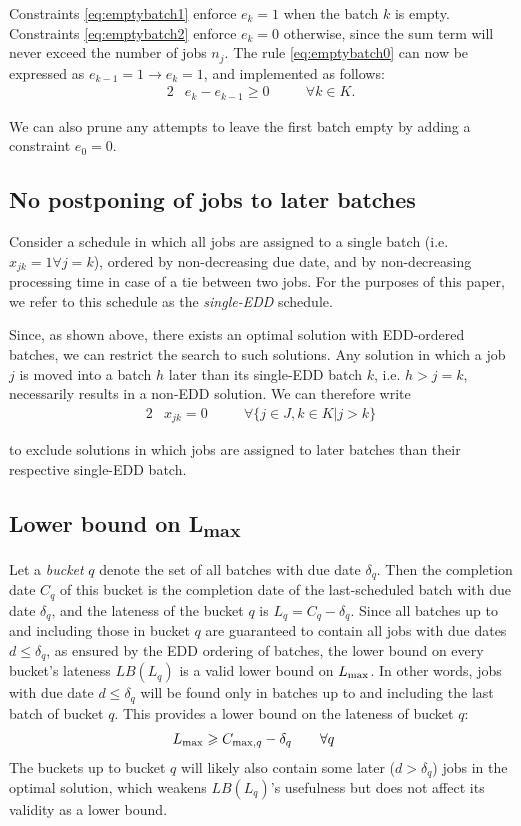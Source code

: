 \documentclass[13pt, letterpaper, oneside]{book}
\begin{document}
Constraints \eqref{eq:emptybatch1} enforce $e_k = 1$ when the batch $k$ is
empty. Constraints \eqref{eq:emptybatch2} enforce $e_k = 0$ otherwise, since the
sum term will never exceed the number of jobs $n_j$. The rule \eqref{eq:emptybatch0} can now be
expressed as $e_{k-1} = 1 \rightarrow e_k = 1$, and implemented as follows:
\begin{alignat}{2}
& e_k - e_{k-1} \geq 0 \quad && \forall k \in K.
\end{alignat}

We can also prune any attempts to leave the first batch empty by adding a constraint $e_0 = 0$.

\subsection{No postponing of jobs to later batches}
\label{sec:nopostponing}
Consider a schedule in which all jobs are assigned to a single batch (i.e.
$x_{jk} = 1 \forall j = k$), ordered by non-decreasing due date, and by
non-decreasing processing time in case of a tie between two jobs. For the
purposes of this paper, we refer to this schedule as the \textit{single-EDD}
schedule. 

Since, as shown above, there exists an optimal solution with EDD-ordered
batches, we can restrict the search to such solutions. Any solution in which
a job $j$ is moved into a batch $h$ later than its single-EDD batch $k$, i.e. $h
> j = k$, necessarily results in a non-EDD solution. We can therefore write
\begin{alignat}{2}
  & x_{jk} = 0 \quad && \forall \{j \in J, k \in K | j > k \} \label{eq:mipnopp}
\end{alignat}

to exclude solutions in which jobs are assigned to later batches than their
respective single-EDD batch.

\subsection[Lower bound on $\Lmax$]{Lower bound on {\sansitalicfont L}\textsubscript{max}}
Let a \textit{bucket} $q$ denote the set of all batches with due date $\delta_q$.
Then the completion date $C_q$ of this bucket is the completion date of the
last-scheduled batch with due date $\delta_q$, and the lateness of the bucket
$q$ is $L_q = C_q - \delta_q$. Since all batches up to and including those in
bucket $q$ are guaranteed to contain all jobs with due dates $d \leq \delta_q$,
as ensured by the EDD ordering of batches, the lower bound on every bucket's
lateness $LB(L_q)$ is a valid lower bound on $\Lmax$. In other words,
jobs with due date $d \leq \delta_q$ will be found only in batches up to and
including the last
batch of bucket $q$. This provides a lower bound on the lateness of bucket $q$:
\begin{alignat}{2}
& L_{\text{max}} \geqslant C_{\text{max},q} - \delta_q \quad && \forall q
\end{alignat}
The buckets up to bucket $q$ will likely also contain some later ($d >
\delta_q$) jobs in the optimal solution, which weakens $LB(L_q)$'s usefulness
but does not affect its validity as a lower bound.
\end{document}
